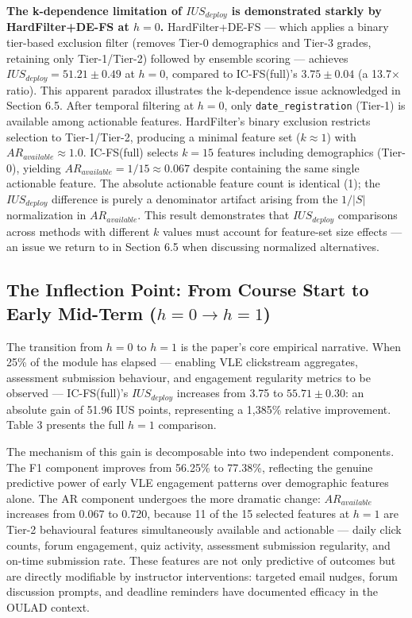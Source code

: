 \documentclass[a4paper,fleqn]{cas-sc}
\begin{document}
\textbf{The k-dependence limitation of $IUS_{deploy}$ is demonstrated starkly by HardFilter+DE-FS at $h=0$.} HardFilter+DE-FS --- which applies a binary tier-based exclusion filter (removes Tier-0 demographics and Tier-3 grades, retaining only Tier-1/Tier-2) followed by ensemble scoring --- achieves $IUS_{deploy} = 51.21 \pm 0.49$ at $h=0$, compared to IC-FS(full)'s $3.75 \pm 0.04$ (a 13.7$\times$ ratio). This apparent paradox illustrates the k-dependence issue acknowledged in Section 6.5. After temporal filtering at $h=0$, only \texttt{date\_registration} (Tier-1) is available among actionable features. HardFilter's binary exclusion restricts selection to Tier-1/Tier-2, producing a minimal feature set ($k \approx 1$) with $AR_{available} \approx 1.0$. IC-FS(full) selects $k=15$ features including demographics (Tier-0), yielding $AR_{available} = 1/15 \approx 0.067$ despite containing the same single actionable feature. The absolute actionable feature count is identical (1); the $IUS_{deploy}$ difference is purely a denominator artifact arising from the $1/|S|$ normalization in $AR_{available}$. This result demonstrates that $IUS_{deploy}$ comparisons across methods with different $k$ values must account for feature-set size effects --- an issue we return to in Section 6.5 when discussing normalized alternatives.

\subsection{The Inflection Point: From Course Start to Early Mid-Term ($h=0 \to h=1$)}

The transition from $h=0$ to $h=1$ is the paper's core empirical narrative. When 25\% of the module has elapsed --- enabling VLE clickstream aggregates, assessment submission behaviour, and engagement regularity metrics to be observed --- IC-FS(full)'s $IUS_{deploy}$ increases from 3.75 to $55.71 \pm 0.30$: an absolute gain of 51.96 IUS points, representing a 1,385\% relative improvement. Table 3 presents the full $h=1$ comparison.

The mechanism of this gain is decomposable into two independent components. The F1 component improves from 56.25\% to 77.38\%, reflecting the genuine predictive power of early VLE engagement patterns over demographic features alone. The AR component undergoes the more dramatic change: $AR_{available}$ increases from 0.067 to 0.720, because 11 of the 15 selected features at $h=1$ are Tier-2 behavioural features simultaneously available and actionable --- daily click counts, forum engagement, quiz activity, assessment submission regularity, and on-time submission rate. These features are not only predictive of outcomes but are directly modifiable by instructor interventions: targeted email nudges, forum discussion prompts, and deadline reminders have documented efficacy in the OULAD context.
\end{document}
